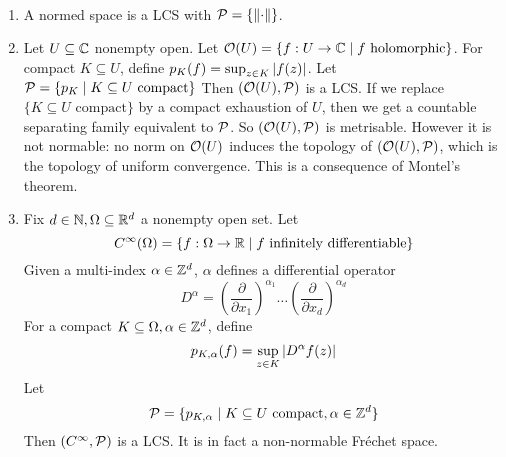 \documentclass{article}
\begin{document}
\begin{egs*}~

  \begin{enumerate}
    \item A normed space is a LCS with $\mathcal P = \{\left\lVert \cdot\right\rVert\}$.
    \item Let $U \subseteq \mathbb C$ nonempty open. Let $\mathcal O(U) = \{f : U \to \mathbb C \mid f \text{ holomorphic}\}$. For compact $K \subseteq U$, define $p_K(f) = \sup_{z \in K} \left\lvert f(z)\right\rvert$. Let
    $\mathcal P = \{p_K \mid K \subseteq U \text{ compact}\}$
    Then $(\mathcal O(U), \mathcal P)$ is a LCS. If we replace $\{K \subseteq U \text{ compact}\}$ by a compact exhaustion of $U$, then we get a countable separating family equivalent to $\mathcal P$. So $(\mathcal O(U), \mathcal P)$ is metrisable. However it is not normable: no norm on $\mathcal O(U)$ induces the topology of $(\mathcal O(U), \mathcal P)$, which is the topology of uniform convergence. This is a consequence of Montel's theorem.
    \item Fix $d \in \mathbb N, \Omega \subseteq \mathbb R^d$ a nonempty open set. Let
    $$C^\infty(\Omega) = \{f : \Omega \to \mathbb R \mid f \text{ infinitely differentiable}\}$$
    Given a multi-index $\alpha \in \mathbb Z^d$, $\alpha$ defines a differential operator
    $$D^\alpha = \left(\frac\partial{\partial x_1}\right)^{\alpha_1} \dots
    \left(\frac\partial{\partial x_d}\right)^{\alpha_d}$$
    For a compact $K \subseteq \Omega, \alpha \in \mathbb Z^d$, define
    $$p_{K, \alpha}(f) = \sup_{z \in K}\left\lvert D^\alpha f(z)\right\rvert$$
    Let
    $$\mathcal P = \{p_{K, \alpha} \mid K \subseteq U \text{ compact}, \alpha \in \mathbb Z^d\}$$
    Then $(C^\infty, \mathcal P)$ is a LCS. It is in fact a non-normable Fréchet space.
  \end{enumerate}
\end{egs*}
\end{document}
